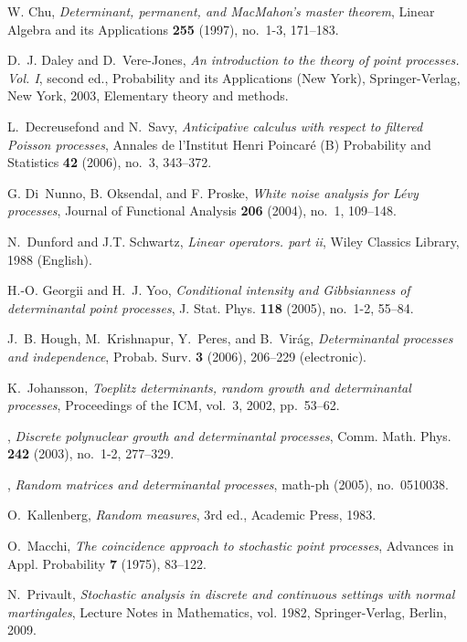 \documentclass[11pt,a4paper]{amsart}
\begin{document}
\begin{thebibliography}{10}
 W. Chu, \emph{Determinant, permanent, and
    {M}ac{M}ahon's master theorem}, Linear Algebra and its
  Applications \textbf{255} (1997), no.~1-3, 171--183.

 D.~J. Daley and D.~Vere-Jones, \emph{An
    introduction to the theory of point processes. {V}ol. {I}}, second
  ed., Probability and its Applications (New York), Springer-Verlag,
  New York, 2003, Elementary theory and methods.
  

 L.~Decreusefond and N.~Savy,
  \emph{Anticipative calculus with respect to filtered {P}oisson
    processes}, Annales de l'Institut Henri Poincar{\'e} (B)
  Probability and Statistics \textbf{42} (2006), no.~3, 343--372.

 G. Di~Nunno, B. Oksendal, and F. Proske,
  \emph{White noise analysis for L\'evy processes}, Journal of
  Functional Analysis \textbf{206} (2004), no.~1, 109--148.

 N.~Dunford and J.T. Schwartz, \emph{Linear
    operators. part ii}, Wiley Classics Library, 1988 (English).

 H.-O. Georgii and H.~J. Yoo, \emph{Conditional
    intensity and {G}ibbsianness of determinantal point processes},
  J. Stat. Phys. \textbf{118} (2005), no.~1-2, 55--84.

 J.~B. Hough, M.~Krishnapur, Y.~Peres, and
  B.~Vir{\'a}g, \emph{Determinantal processes and independence},
  Probab. Surv. \textbf{3} (2006), 206--229 (electronic).

 K.~Johansson, \emph{Toeplitz determinants,
    random growth and determinantal processes}, Proceedings of the
  ICM, vol.~3, 2002, pp.~53--62.

 \bysame, \emph{Discrete polynuclear growth and
    determinantal processes}, Comm.  Math. Phys. \textbf{242} (2003),
  no.~1-2, 277--329.

 \bysame, \emph{Random matrices and
    determinantal processes}, math-ph (2005), no.~0510038.

 O.~Kallenberg, \emph{Random measures}, 3rd ed.,
  Academic Press, 1983.

 O.~Macchi, \emph{The coincidence approach to
    stochastic point processes}, Advances in Appl. Probability
  \textbf{7} (1975), 83--122.

 N.~Privault, \emph{Stochastic analysis in discrete
    and continuous settings with normal martingales}, Lecture Notes in
  Mathematics, vol. 1982, Springer-Verlag, Berlin, 2009.


\end{thebibliography}
\end{document}
